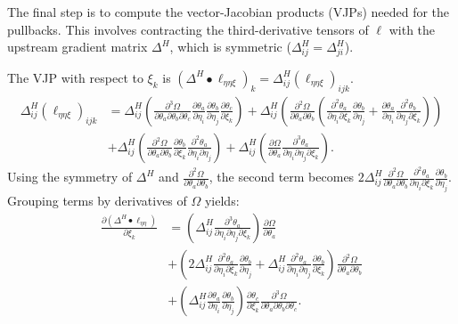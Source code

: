 \documentclass{article}
\begin{document}
The final step is to compute the vector-Jacobian products (VJPs) needed for the pullbacks.
This involves contracting the third-derivative tensors of $\ell$ with the upstream gradient matrix $\Delta^H$, which is symmetric ($\Delta^H_{ij} = \Delta^H_{ji}$).

The VJP with respect to $\xi_k$ is $(\Delta^H \bullet \ell_{\eta\eta\xi})_k = \Delta^H_{ij} (\ell_{\eta\eta\xi})_{ijk}$.
%
\begin{align}
  \Delta^H_{ij} (\ell_{\eta\eta\xi})_{ijk} & = \Delta^H_{ij} \left( \frac{\partial^3 \Omega}{\partial \theta_a \partial \theta_b \partial \theta_c} \frac{\partial \theta_a}{\partial \eta_i} \frac{\partial \theta_b}{\partial \eta_j} \frac{\partial \theta_c}{\partial \xi_k} \right) + \Delta^H_{ij} \left( \frac{\partial^2 \Omega}{\partial \theta_a \partial \theta_b} \left( \frac{\partial^2 \theta_a}{\partial \eta_i \partial \xi_k} \frac{\partial \theta_b}{\partial \eta_j} + \frac{\partial \theta_a}{\partial \eta_i} \frac{\partial^2 \theta_b}{\partial \eta_j \partial \xi_k} \right) \right) \\
                                           & + \Delta^H_{ij} \left( \frac{\partial^2 \Omega}{\partial \theta_a \partial \theta_b} \frac{\partial \theta_b}{\partial \xi_k} \frac{\partial^2 \theta_a}{\partial \eta_i \partial \eta_j} \right) + \Delta^H_{ij} \left( \frac{\partial \Omega}{\partial \theta_a} \frac{\partial^3 \theta_a}{\partial \eta_i \partial \eta_j \partial \xi_k} \right).
\end{align}
%
Using the symmetry of $\Delta^H$ and $\frac{\partial^2 \Omega}{\partial \theta_a \partial \theta_b}$, the second term becomes $2 \Delta^H_{ij} \frac{\partial^2 \Omega}{\partial \theta_a \partial \theta_b} \frac{\partial^2 \theta_a}{\partial \eta_i \partial \xi_k} \frac{\partial \theta_b}{\partial \eta_j}$.
Grouping terms by derivatives of $\Omega$ yields:
%
\begin{align}
  \frac{\partial (\Delta^H \bullet \ell_{\eta\eta})}{\partial \xi_k} & = \left( \Delta^H_{ij} \frac{\partial^3 \theta_a}{\partial \eta_i \partial \eta_j \partial \xi_k} \right) \frac{\partial \Omega}{\partial \theta_a}                                                                                                                                                                      \\
                                                                   & + \left( 2 \Delta^H_{ij} \frac{\partial^2 \theta_a}{\partial \eta_i \partial \xi_k} \frac{\partial \theta_b}{\partial \eta_j} + \Delta^H_{ij} \frac{\partial^2 \theta_a}{\partial \eta_i \partial \eta_j} \frac{\partial \theta_b}{\partial \xi_k} \right) \frac{\partial^2 \Omega}{\partial \theta_a \partial \theta_b} \\
                                                                   & + \left( \Delta^H_{ij} \frac{\partial \theta_a}{\partial \eta_i} \frac{\partial \theta_b}{\partial \eta_j} \right) \frac{\partial \theta_c}{\partial \xi_k} \frac{\partial^3 \Omega}{\partial \theta_a \partial \theta_b \partial \theta_c}.
\end{align}
\end{document}
